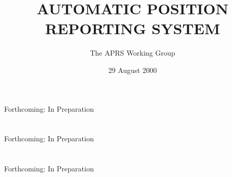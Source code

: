 \documentclass{report}
\title{AUTOMATIC POSITION REPORTING SYSTEM}
\date{29 August 2000}
\author{The APRS Working Group}
\begin{document}
\maketitle



 


 

 \tableofcontents


 


 


 


 















% 
\chapter{}
Forthcoming: In Preparation

% 
\chapter{}
Forthcoming: In Preparation

% 
\chapter{}
Forthcoming: In Preparation
\end{document}
